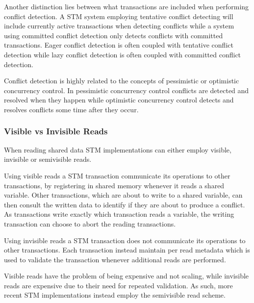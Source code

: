 Another distinction lies between what transactions are included when performing conflict detection. A \ac{STM} system employing tentative conflict detecting will include currently active transactions when detecting conflicts while a system using committed conflict detection only detects conflicts with committed transactions. Eager conflict detection is often coupled with tentative conflict detection while lazy conflict detection is often coupled with committed conflict detection\cite[p. 22]{harris2010transactional}. 

Conflict detection is highly related to the concepts of pessimistic or optimistic concurrency control. In pessimistic concurrency control conflicts are detected and resolved when they happen\cite[p. 20]{harris2010transactional} while optimistic concurrency control detects and resolves conflicts some time after they occur\cite[p. 20]{harris2010transactional}.

\subsubsection{Visible vs Invisible Reads}
When reading shared data \ac{STM} implementations can either employ visible, invisible or semivisible reads.

Using visible reads a \ac{STM} transaction communicate its operations to other transactions, by registering in shared memory whenever it reads a shared variable\cite[p. 2]{lev2009anatomy}\cite[p. 2085]{herlihy2011tm}. Other transactions, which are about to write to a shared variable, can then consult the written data to identify if they are about to produce a conflict. As transactions write exactly which transaction reads a variable, the writing transaction can choose to abort the reading transactions\cite[p. 2]{lev2009anatomy}.

Using invisible reads a \ac{STM} transaction does not communicate its operations to other transactions\cite[p. 114]{imbs2012virtual}. Each transaction instead maintain per read metadata which is used to validate the transaction whenever additional reads are performed\cite[p. 2085]{herlihy2011tm}.

Visible reads have the problem of being expensive and not scaling, while invisible reads are expensive due to their need for repeated validation. As such, more recent \ac{STM} implementations instead employ the semivisible read scheme\cite[p. 2085]{herlihy2011tm}.

